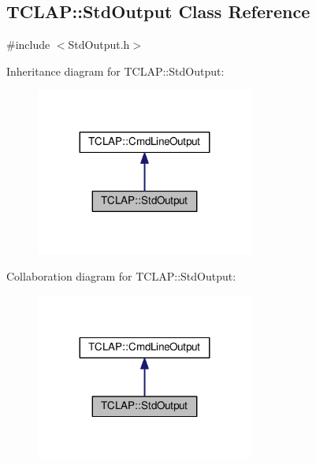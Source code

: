 \hypertarget{classTCLAP_1_1StdOutput}{}\subsection{T\+C\+L\+AP\+:\+:Std\+Output Class Reference}
\label{classTCLAP_1_1StdOutput}


{\ttfamily \#include $<$Std\+Output.\+h$>$}



Inheritance diagram for T\+C\+L\+AP\+:\+:Std\+Output\+:
\nopagebreak
\begin{figure}[H]
\begin{center}
\leavevmode
\includegraphics[width=203pt]{classTCLAP_1_1StdOutput__inherit__graph}
\end{center}
\end{figure}


Collaboration diagram for T\+C\+L\+AP\+:\+:Std\+Output\+:
\nopagebreak
\begin{figure}[H]
\begin{center}
\leavevmode
\includegraphics[width=203pt]{classTCLAP_1_1StdOutput__coll__graph}
\end{center}
\end{figure}
